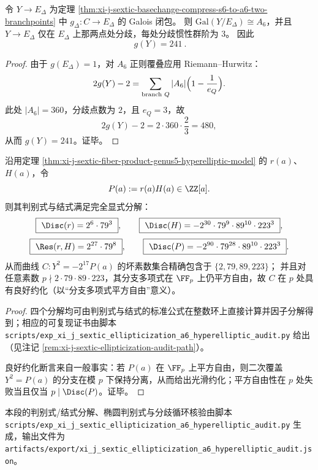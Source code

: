 \begin{corollary}[\(A_6\) 正则闭包曲线的属数与两处分歧]\label{cor:xi-j-sextic-a6-galois-closure-genus-241}
令 \(Y\to E_\Delta\) 为定理 \ref{thm:xi-j-sextic-basechange-compress-s6-to-a6-two-branchpoints} 中 \(g_\Delta:C\to E_\Delta\) 的 Galois 闭包。
则 \(\mathrm{Gal}(Y/E_\Delta)\cong A_6\)，并且 \(Y\to E_\Delta\) 仅在 \(E_\Delta\) 上那两点处分歧，每处分歧惯性群阶为 \(3\)。
因此
\[
\boxed{\ g(Y)=241\ }.
\]
\end{corollary}
\begin{proof}
由于 \(g(E_\Delta)=1\)，对 \(A_6\) 正则覆叠应用 Riemann--Hurwitz：
\[
2g(Y)-2
=\sum_{\text{branch }Q}|A_6|\Bigl(1-\frac1{e_Q}\Bigr).
\]
此处 \(|A_6|=360\)，分歧点数为 \(2\)，且 \(e_Q=3\)，故
\[
2g(Y)-2=2\cdot 360\cdot\frac{2}{3}=480,
\]
从而 \(g(Y)=241\)。证毕。
\end{proof}

\begin{theorem}[超椭圆分支多项式的判别式与坏素数集合]\label{thm:xi-j-sextic-hyperelliptic-branch-polynomial-discriminant-factorization}
沿用定理 \ref{thm:xi-j-sextic-fiber-product-genus5-hyperelliptic-model} 的 \(r(a)\)、\(H(a)\)，令
\[
P(a):=r(a)H(a)\in\ZZ[a].
\]
则其判别式与结式满足完全显式分解：
\[
\boxed{\ \Disc(r)=2^{6}\cdot 79^{3}\ },
\qquad
\boxed{\ \Disc(H)=-2^{30}\cdot 79^{9}\cdot 89^{10}\cdot 223^{3}\ },
\]
\[
\boxed{\ \Res(r,H)=2^{27}\cdot 79^{8}\ },
\qquad
\boxed{\ \Disc(P)=-2^{90}\cdot 79^{28}\cdot 89^{10}\cdot 223^{3}\ }.
\]
从而曲线 \(C:Y^2=-2^{17}P(a)\) 的坏素数集合精确包含于 \(\{2,79,89,223\}\)；
并且对任意素数 \(p\nmid 2\cdot 79\cdot 89\cdot 223\)，其分支多项式在 \(\FF_p\) 上仍平方自由，故 \(C\) 在 \(p\) 处具有良好约化（以“分支多项式平方自由”意义）。
\end{theorem}
\begin{proof}
四个分解均可由判别式与结式的标准公式在整数环上直接计算并因子分解得到；相应的可复现证书由脚本 \texttt{scripts/exp\_xi\_j\_sextic\_ellipticization\_a6\_hyperelliptic\_audit.py} 给出（见注记 \ref{rem:xi-j-sextic-ellipticization-audit-path}）。
\par
良好约化断言来自一般事实：若 \(P(a)\) 在 \(\FF_p\) 上平方自由，则二次覆盖 \(Y^2=P(a)\) 的分支在模 \(p\) 下保持分离，从而给出光滑约化；平方自由性在 \(p\) 处失败当且仅当 \(p\mid \Disc(P)\)。证毕。
\end{proof}

\begin{remark}[可复现证书路径]\label{rem:xi-j-sextic-ellipticization-audit-path}
本段的判别式/结式分解、椭圆判别式与分歧循环核验由脚本
\texttt{scripts/exp\_xi\_j\_sextic\_ellipticization\_a6\_hyperelliptic\_audit.py}
生成，输出文件为
\texttt{artifacts/export/xi\_j\_sextic\_ellipticization\_a6\_hyperelliptic\_audit.json}。
\end{remark}

\endinput

